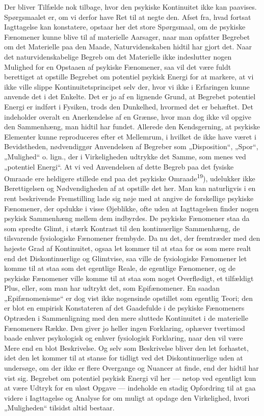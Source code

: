 \documentclass[12pt,a4paper,openany]{book}
\newcommand{\opage}[1]{\marginnote{\footnotesize\textit{[#1]}}}
\begin{document}
Der bliver Tilfælde nok tilbage, hvor den psykiske Kontinuitet ikke kan
paavises. Spørgsmaalet er, om vi derfor have Ret til at negte den. Afset fra,
hvad fortsat Iagttagelse kan konstatere, opstaar her det store Spørgsmaal, om
de psykiske Fænomener kunne blive til af materielle Aarsager, naar man opfatter
Begrebet om det Materielle paa den Maade, Naturvidenskaben hidtil har gjort
det. Naar det naturvidenskabelige Begreb om det Materielle ikke indeslutter
nogen Mulighed for en Opstaaen af psykiske Fænomener, saa vil det være fuldt
berettiget at opstille Begrebet om potentiel psykisk Energi for at markere, at
vi ikke ville slippe Kontinuitetsprincipet selv der, hvor vi ikke i Erfaringen
kunne anvende det i det Enkelte. Det er jo af en lignende Grund, at Begrebet
potentiel Energi er indført i Fysiken, trods den Dunkelhed, hvormed det er
behæftet. Det indeholder overalt en Anerkendelse af en Grænse, hvor man
\opage{21}dog ikke vil opgive den Sammenhæng, man hidtil har fundet. Allerede
den Kendsgerning, at psykiske Elementer kunne reproduceres efter et Mellemrum,
i hvilket de ikke have været i Bevidstheden, nødvendiggør Anvendelsen af
Begreber som „Disposition“, „Spor“, „Mulighed“ o. lign., der i Virkeligheden
udtrykke det Samme, som menes ved „potentiel Energi“. At vi ved Anvendelsen af
dette Begreb paa det fysiske Omraade ere heldigere stillede end paa det
psykiske Omraade\textsuperscript{19}), udelukker ikke Berettigelsen og
Nødvendigheden af at opstille det her. Man kan naturligvis i en rent
beskrivende Fremstilling lade sig nøje med at angive de forskellige psykiske
Fænomener, der opdukke i visse Øjeblikke, ofte uden at Iagttagelsen finder
nogen psykisk Sammenhæng mellem dem indbyrdes. De psykiske Fænomener staa da
som spredte Glimt, i stærk Kontrast til den kontinuerlige Sammenhæng, de
tilsvarende fysiologiske Fænomener frembyde. Da nu det, der fremtræder med den
højeste Grad af Kontinuitet, ogsaa let kommer til at staa for os som mere realt
end det Diskontinuerlige og Glimtvise, saa ville de fysiologiske Fænomener let
komme til at staa som det egentlige Reale, de egentlige Fænomener, og de
psykiske Fænomener ville komme til at staa som noget Overflødigt, et tilfældigt
Plus, eller, som man har udtrykt det, som Epifænomener. En saadan
„Epifænomenisme“ er dog vist ikke nogensinde opstillet som egentlig Teori; den
er blot en empirisk Konstateren af det Gaadefulde i de psykiske Fænomeners
Optræden i Sammenligning med den mere sluttede Kontinuitet i de materielle
Fænomeners Række. Den giver jo heller ingen Forklaring, ophæver tvertimod baade
enhver psykologisk og enhver fysiologisk Forklaring, naar den vil være Mere end
en blot Beskrivelse. Og selv som Beskrivelse bliver den let forhastet, idet den
let kommer til at stanse for tidligt ved det Diskontinuerlige uden at
undersøge, om der ikke er flere Overgange og Nuancer at finde, end der hidtil
har vist sig. Begrebet om potentiel psykisk Energi vil her --- netop ved
egentligt kun at være Udtryk for en uløst Opgave --- indeholde en stadig
Opfordring til at gaa videre i Iagttagelse og Analyse for om muligt at opdage
den Virkelighed, hvori „Muligheden“ tilsidst altid bestaar.
\end{document}

